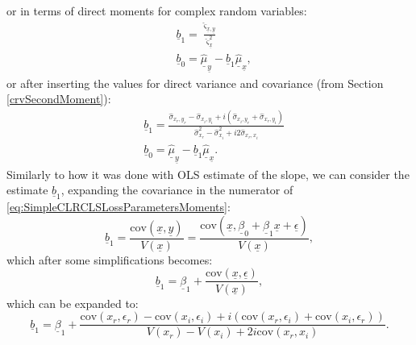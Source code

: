 \documentclass[
]{book}
\begin{document}
or in terms of direct moments for complex random variables:
\begin{equation}
    \begin{aligned}
        & \underline{b}_1 = \frac{\hat{\varsigma}_{\underline{x},\underline{y}}}{\hat{\varsigma}_{\underline{x}}^2} \\
        & \underline{b}_0 = \underline{\hat{\mu}}_{\underline{y}} - \underline{b}_1 \underline{\hat{\mu}}_{\underline{x}} ,
    \end{aligned}
    \label{eq:SimpleCLRCLSLossParametersMoments}
\end{equation}
or after inserting the values for direct variance and covariance (from Section \ref{crvSecondMoment}):
\begin{equation}
    \begin{aligned}
        & \underline{b}_1 = \frac{\hat{\sigma}_{x_r, y_r} - \hat{\sigma}_{x_i, y_i} + i (\hat{\sigma}_{x_i, y_r} + \hat{\sigma}_{x_r, y_i})}{\hat{\sigma}_{x_r}^2 - \hat{\sigma}_{x_i}^2 + i2 \hat{\sigma}_{x_r,x_i}} \\
        & \underline{b}_0 = \underline{\hat{\mu}}_{\underline{y}} - \underline{b}_1 \underline{\hat{\mu}}_{\underline{x}} .
    \end{aligned}
    \label{eq:SimpleCLRCLSLossParametersMomentsExpanded}
\end{equation}
Similarly to how it was done with OLS estimate of the slope, we can consider the estimate \(\underline{b}_1\), expanding the covariance in the numerator of \eqref{eq:SimpleCLRCLSLossParametersMoments}:
\begin{equation}
        \underline{b}_1 = \frac{\mathrm{cov}(\underline{x},\underline{y})}{V(\underline{x})} = \frac{\mathrm{cov}(\underline{x},\underline{\beta}_0 + \underline{\beta}_1 \underline{x} + \underline{\epsilon})}{V(\underline{x})},
    \label{eq:SimpleCLRCLSb1Expansion01}
\end{equation}
which after some simplifications becomes:
\begin{equation}
        \underline{b}_1 = \underline{\beta}_1 + \frac{\mathrm{cov}(\underline{x}, \underline{\epsilon})}{V(\underline{x})} ,
    \label{eq:SimpleCLRCLSb1Expansion02}
\end{equation}
which can be expanded to:
\begin{equation}
    \underline{b}_1 = \underline{\beta}_1 + \frac{\mathrm{cov}(x_r, \epsilon_r) - \mathrm{cov}(x_i, \epsilon_i) + i (\mathrm{cov}(x_r, \epsilon_i) + \mathrm{cov}(x_i, \epsilon_r))}{V(x_r) - V(x_i) + 2i \mathrm{cov}(x_r, x_i)} . 
    \label{eq:SimpleCLRCLSb1Expansion03}
\end{equation}
\end{document}

